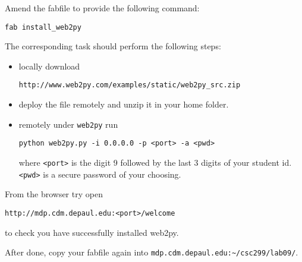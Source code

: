 \documentclass[12pt]{article}
\begin{document}
\noindent Amend the fabfile to provide the following command:
\begin{verbatim}
fab install_web2py
\end{verbatim}
\noindent The corresponding task should perform the following steps:
\begin{itemize}
\item locally download
{\footnotesize\begin{verbatim}
http://www.web2py.com/examples/static/web2py_src.zip
\end{verbatim}}
\item deploy the file remotely and unzip it in your home folder.
\item remotely under {\tt web2py} run 
\begin{verbatim}
python web2py.py -i 0.0.0.0 -p <port> -a <pwd>
\end{verbatim} where {\tt <port>} is the digit 9 followed by the last 3 digits of your student id. {\tt <pwd>} is a secure password of your choosing.
\end{itemize}
\noindent From the browser try open 
{\footnotesize\begin{verbatim}
http://mdp.cdm.depaul.edu:<port>/welcome
\end{verbatim}}  
\noindent to check you have successfully installed web2py.

After done, copy your fabfile again into {\verb!mdp.cdm.depaul.edu:~/csc299/lab09/!}.
\end{document}
